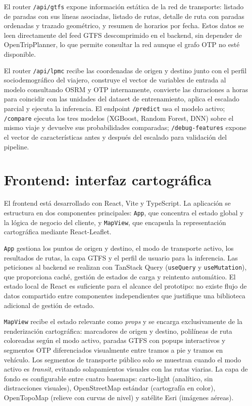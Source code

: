 El router \texttt{/api/gtfs} expone información estática de la red de transporte: listado de paradas con sus líneas asociadas, listado de rutas, detalle de ruta con paradas ordenadas y trazado geométrico, y resumen de horarios por fecha. Estos datos se leen directamente del feed GTFS descomprimido en el backend, sin depender de OpenTripPlanner, lo que permite consultar la red aunque el grafo OTP no esté disponible.

El router \texttt{/api/lpmc} recibe las coordenadas de origen y destino junto con el perfil sociodemográfico del viajero, construye el vector de variables de entrada al modelo consultando OSRM y OTP internamente, convierte las duraciones a horas para coincidir con las unidades del dataset de entrenamiento, aplica el escalado parcial y ejecuta la inferencia. El endpoint \texttt{/predict} usa el modelo activo; \texttt{/compare} ejecuta los tres modelos (XGBoost, Random Forest, DNN) sobre el mismo viaje y devuelve sus probabilidades comparadas; \texttt{/debug-features} expone el vector de características antes y después del escalado para validación del pipeline.

\section{Frontend: interfaz cartográfica}
\label{sec:arch_frontend}

El frontend está desarrollado con React, Vite y TypeScript. La aplicación se estructura en dos componentes principales: \texttt{App}, que concentra el estado global y la lógica de negocio del cliente, y \texttt{MapView}, que encapsula la representación cartográfica mediante React-Leaflet.

\texttt{App} gestiona los puntos de origen y destino, el modo de transporte activo, los resultados de rutas, la capa GTFS y el perfil de usuario para la inferencia. Las peticiones al backend se realizan con TanStack Query (\texttt{useQuery} y \texttt{useMutation}), que proporciona caché, gestión de estados de carga y reintento automático. El estado local de React es suficiente para el alcance del prototipo: no existe flujo de datos compartido entre componentes independientes que justifique una biblioteca adicional de gestión de estado.

\texttt{MapView} recibe el estado relevante como \textit{props} y se encarga exclusivamente de la renderización cartográfica: marcadores de origen y destino, polilíneas de ruta coloreadas según el modo activo, paradas GTFS con popups interactivos y segmentos OTP diferenciados visualmente entre tramos a pie y tramos en vehículo. Los segmentos de transporte público solo se muestran cuando el modo activo es \textit{transit}, evitando solapamientos visuales con las rutas viarias. La capa de fondo es configurable entre cuatro basemaps: carto-light (analítico, sin distracciones visuales), OpenStreetMap estándar (cartografía en color), OpenTopoMap (relieve con curvas de nivel) y satélite Esri (imágenes aéreas).

